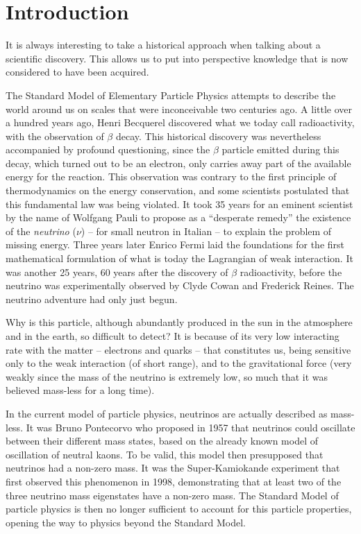 \chapter*{Introduction}
\label{ch:intro}

It is always interesting to take a historical approach when talking about a scientific discovery. This allows us to put into perspective knowledge that is now considered to have been acquired.

The Standard Model of Elementary Particle Physics attempts to describe the world around us on scales that were inconceivable two centuries ago.
A little over a hundred years ago, Henri Becquerel discovered what we today call radioactivity, with the observation of $\beta$ decay.
This historical discovery was nevertheless accompanied by profound questioning, since the $\beta$ particle emitted during this decay, which turned out to be an electron, only carries away part of the available energy for the reaction.
This observation was contrary to the first principle of thermodynamics on the energy conservation, and some scientists postulated that this fundamental law was being violated.
It took 35 years for an eminent scientist by the name of Wolfgang Pauli to propose as a ``desperate remedy'' the existence of the \emph{neutrino} ($\nu$) -- for small neutron in Italian -- to explain the problem of missing energy.
Three years later Enrico Fermi laid the foundations for the first mathematical formulation of what is today the Lagrangian of weak interaction.
It was another 25 years, 60 years after the discovery of $\beta$ radioactivity, before the neutrino was experimentally observed by Clyde Cowan and Frederick Reines.
The neutrino adventure had only just begun.

Why is this particle, although abundantly produced in the sun in the atmosphere and in the earth, so difficult to detect?
It is because of its very low interacting rate with the matter -- electrons and quarks -- that constitutes us, being sensitive only to the weak interaction (of short range), and to the gravitational force (very weakly since the mass of the neutrino is extremely low, so much that it was believed mass-less for a long time).

In the current model of particle physics, neutrinos are actually described as mass-less.
It was Bruno Pontecorvo who proposed in 1957 that neutrinos could oscillate between their different mass states, based on the already known model of oscillation of neutral kaons.
To be valid, this model then presupposed that neutrinos had a non-zero mass.
It was the Super-Kamiokande experiment that first observed this phenomenon in 1998, demonstrating that at least two of the three neutrino mass eigenstates have a non-zero mass.
The Standard Model of particle physics is then no longer sufficient to account for this particle properties, opening the way to physics beyond the Standard Model.

